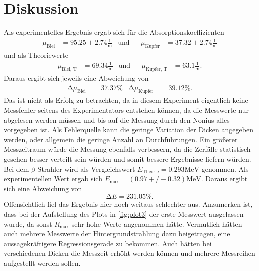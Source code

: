 \section{Diskussion}
\label{sec:Diskussion}

Als experimentelles Ergebnis ergab sich für die Absorptionskoeffizienten
\begin{align*}
    \mu_\text{Blei} &= 95.25 \pm 2.74 \frac{1}{\unit\meter}&\text{und}&&\mu_\text{Kupfer} &= 37.32 \pm 2.74 \frac{1}{\unit\meter}
\end{align*}
und als Theoriewerte 
\begin{align*}
    \mu_\text{Blei, T} &= 69.34 \frac{1}{\unit\meter}&\text{und}&&\mu_\text{Kupfer, T} &= 63.1 \frac{1}{\unit\meter}.
\end{align*} 
Daraus ergibt sich jeweils eine Abweichung von
\begin{align*}
    \increment \mu_\text{Blei} &= 37.37 \%&\increment \mu_\text{Kupfer} &= 39.12 \%.
\end{align*}
Das ist nicht als Erfolg zu betrachten, da in diesem Experiment eigentlich keine Messfehler seitens des
Experimentators entstehen können, da die Messwerte nur abgelesen werden müssen und bis auf die Messung durch den Nonius
alles vorgegeben ist.
Als Fehlerquelle kann die geringe Variation der Dicken angegeben werden, oder allgemein die geringe Anzahl an Durchführungen.
Ein größerer Messzeitraum würde die Messung ebenfalls verbessern, da die Zerfälle statistisch gesehen besser verteilt sein würden und somit bessere Ergebnisse liefern würden.\\

Bei dem $\beta$-Strahler wird als Vergleichswert \cite{technetium99} $E_\text{Theorie} = 0.293 \unit{\mega\eV}$ genommen.
Als experimentellen Wert ergab sich $E_\text{max} = (0.97+/-0.32) \unit{\mega\eV}$.
Daraus ergibt sich eine Abweichung von
\begin{equation*}
    \increment E = 231.05 \%.
\end{equation*}
Offensichtlich fiel das Ergebnis hier noch weitaus schlechter aus.
Anzumerken ist, dass bei der Aufstellung des Plots in \autoref{fig:plot3} der erste Messwert ausgelassen wurde, da sonst
$R_\text{max}$ sehr hohe Werte angenommen hätte.
Vermutlich hätten auch mehrere Messwerte der Hintergrundstrahlung dazu beigetragen, eine aussagekräftigere Regressionsgerade zu bekommen.
Auch hätten bei verschiedenen Dicken die Messzeit erhöht werden können und mehrere Messreihen aufgestellt werden sollen.
